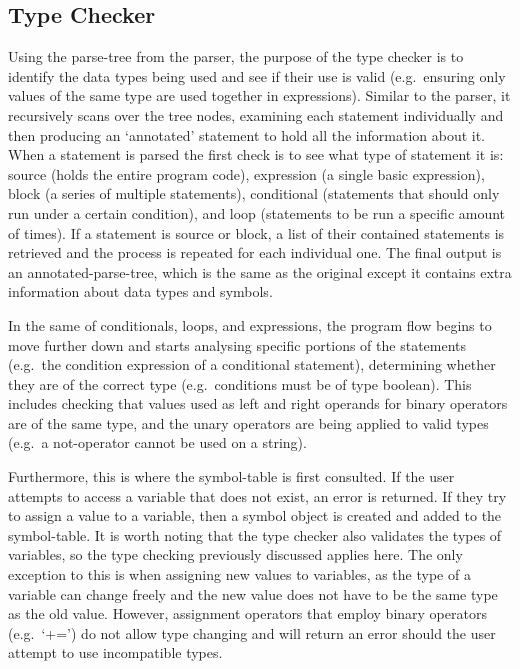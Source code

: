 \documentclass[
]{report}
\begin{document}
\subsection{Type Checker}
Using the \gls{parse-tree} from the parser, the purpose of the type checker is
to identify the data types being used and see if their use is valid
(e.g.~ensuring only values of the same type are used together in
\glspl{expression}). Similar to the parser, it recursively scans over the tree
nodes, examining each \gls{statement} individually and then producing an
`annotated' \gls{statement} to hold all the information about it. When a
\gls{statement} is parsed the first check is to see what type of \gls{statement} it
is: source (holds the entire program code), \gls{expression} (a single basic
\gls{expression}), block (a series of multiple \glspl{statement}), conditional
(\glspl{statement} that should only run under a certain condition), and loop
(\glspl{statement} to be run a specific amount of times). If a \gls{statement} is
source or block, a list of their contained \glspl{statement} is retrieved and
the process is repeated for each individual one. The final output is an
\gls{annotated-parse-tree}, which is the same as the original except it
contains extra information about data types and \glspl{symbol}.

In the same of conditionals, loops, and \glspl{expression}, the program flow
begins to move further down and starts analysing specific portions of
the \glspl{statement} (e.g.~the condition \gls{expression} of a conditional
\gls{statement}), determining whether they are of the correct type
(e.g.~conditions must be of type boolean). This includes checking that
values used as left and right operands for binary operators are of the
same type, and the unary operators are being applied to valid types
(e.g.~a not-operator cannot be used on a string).

Furthermore, this is where the \gls{symbol-table} is first consulted. If the
user attempts to access a variable that does not exist, an error is
returned. If they try to assign a value to a variable, then a \gls{symbol}
object is created and added to the \gls{symbol-table}. It is worth noting that
the type checker also validates the types of variables, so the type
checking previously discussed applies here. The only exception to this
is when assigning new values to variables, as the type of a variable can
change freely and the new value does not have to be the same type as the
old value. However, assignment operators that employ binary operators
(e.g.~`+=') do not allow type changing and will return an error should
the user attempt to use incompatible types.
\end{document}

